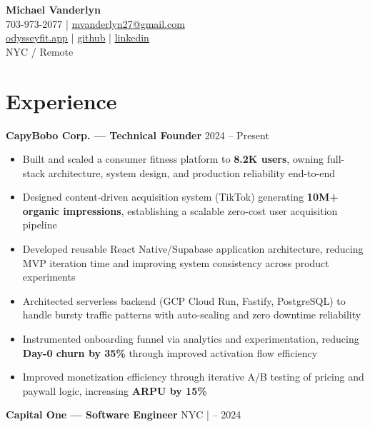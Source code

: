 \documentclass[letterpaper,11pt]{article}
\begin{document}
\begin{center}
{\LARGE \textbf{Michael Vanderlyn}} \\[4pt]
703-973-2077 \quad | \quad \href{mailto:mvanderlyn27@gmail.com}{mvanderlyn27@gmail.com} \\ 
\href{https://odysseyfit.app}{odysseyfit.app} \quad | \quad \href{https://github.com/mvanderlyn27}{github} \quad | \quad \href{https://www.linkedin.com/in/michael-vanderlyn/}{linkedin} \\ 
NYC / Remote
\end{center}

\section*{Experience}

\noindent\textbf{CapyBobo Corp. — Technical Founder} \hfill 2024 – Present

\begin{itemize}[leftmargin=*]
\item Built and scaled a consumer fitness platform to \textbf{8.2K users}, owning full-stack architecture, system design, and production reliability end-to-end
\item Designed content-driven acquisition system (TikTok) generating \textbf{10M+ organic impressions}, establishing a scalable zero-cost user acquisition pipeline
\item Developed reusable React Native/Supabase application architecture, reducing MVP iteration time and improving system consistency across product experiments
\item Architected serverless backend (GCP Cloud Run, Fastify, PostgreSQL) to handle bursty traffic patterns with auto-scaling and zero downtime reliability
\item Instrumented onboarding funnel via analytics and experimentation, reducing \textbf{Day-0 churn by 35\%} through improved activation flow efficiency
\item Improved monetization efficiency through iterative A/B testing of pricing and paywall logic, increasing \textbf{ARPU by 15\%}
\end{itemize}

\vspace{2pt}

\noindent\textbf{Capital One — Software Engineer} \hfill NYC \quad |  – 2024
\end{document}
